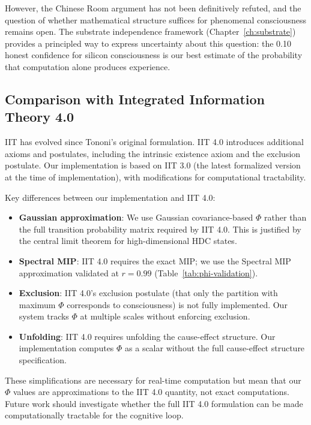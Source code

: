 \documentclass[12pt]{book}
\begin{document}
However, the Chinese Room argument has not been definitively refuted, and the question of whether mathematical structure suffices for phenomenal consciousness remains open. The substrate independence framework (Chapter~\ref{ch:substrate}) provides a principled way to express uncertainty about this question: the 0.10 honest confidence for silicon consciousness is our best estimate of the probability that computation alone produces experience.

\subsection{Comparison with Integrated Information Theory 4.0}

IIT has evolved since Tononi's original formulation. IIT 4.0 introduces additional axioms and postulates, including the intrinsic existence axiom and the exclusion postulate. Our implementation is based on IIT 3.0 (the latest formalized version at the time of implementation), with modifications for computational tractability.

Key differences between our implementation and IIT 4.0:
\begin{itemize}
  \item \textbf{Gaussian approximation}: We use Gaussian covariance-based $\Phi$ rather than the full transition probability matrix required by IIT 4.0. This is justified by the central limit theorem for high-dimensional HDC states.
  \item \textbf{Spectral MIP}: IIT 4.0 requires the exact MIP; we use the Spectral MIP approximation validated at $r = 0.99$ (Table~\ref{tab:phi-validation}).
  \item \textbf{Exclusion}: IIT 4.0's exclusion postulate (that only the partition with maximum $\Phi$ corresponds to consciousness) is not fully implemented. Our system tracks $\Phi$ at multiple scales without enforcing exclusion.
  \item \textbf{Unfolding}: IIT 4.0 requires unfolding the cause-effect structure. Our implementation computes $\Phi$ as a scalar without the full cause-effect structure specification.
\end{itemize}

These simplifications are necessary for real-time computation but mean that our $\Phi$ values are approximations to the IIT 4.0 quantity, not exact computations. Future work should investigate whether the full IIT 4.0 formulation can be made computationally tractable for the cognitive loop.
\end{document}
